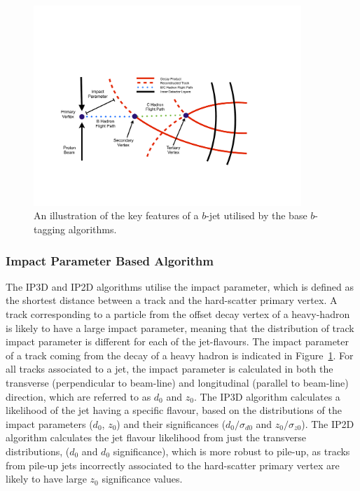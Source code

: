 \begin{figure}[!htb]
  \begin{center}
    \includegraphics[width=0.9\textwidth]{figs/Objects/bjets_schem.pdf}
    \caption{An illustration of the key features of a $b$-jet utilised by the base $b$-tagging algorithms.}
    \label{fig:obj_bjets_schem}
  \end{center}
  \vspace{-0.5cm}
\end{figure}

\subsubsection{Impact Parameter Based Algorithm}
\label{sec:obj-bjets_IP}

The IP3D and IP2D algorithms utilise the impact parameter, which is defined as the shortest distance between a track and the hard-scatter primary vertex.
A track corresponding to a particle from the offset decay vertex of a heavy-hadron is likely to have a large impact parameter,
meaning that the distribution of track impact parameter is different for each of the jet-flavours.
The impact parameter of a track coming from the decay of a heavy hadron is indicated in Figure~\ref{fig:obj_bjets_schem}.
For all tracks associated to a jet, the impact parameter is calculated in both the transverse (perpendicular to beam-line)
and longitudinal (parallel to beam-line) direction, which are referred to as $d_{0}$ and $z_{0}$.
The IP3D algorithm calculates a likelihood of the jet having a specific flavour, 
based on the distributions of the impact parameters ($d_{0}$, $z_{0}$) and their significances 
($d_{0}/\sigma _{d0}$ and  $z_{0}/\sigma_{z0}$). 
The IP2D algorithm calculates the jet flavour likelihood from just the transverse distributions, ($d_{0}$ and $d_{0}$ significance), which is more
robust to pile-up, as tracks from pile-up jets incorrectly associated to the hard-scatter primary vertex are likely to have large $z_{0}$ significance values.

